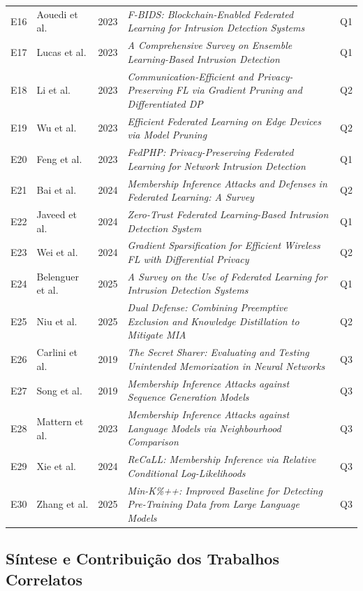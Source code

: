 \documentclass[
	12pt,				%
	openright,			%
	oneside,			%
	a4paper,			%
	english,			%
	french,				%
	spanish,			%
	brazil,				%
	]{abntex2}
\begin{document}
\begin{table}[H]
\begin{tabular}{p{0.4cm}p{3.0cm}p{0.6cm}p{7.5cm}p{1.2cm}}
E16 & Aouedi et al. & 2023 & \textit{F-BIDS: Blockchain-Enabled Federated Learning for Intrusion Detection Systems} & Q1 \\
E17 & Lucas et al. & 2023 & \textit{A Comprehensive Survey on Ensemble Learning-Based Intrusion Detection} & Q1 \\
E18 & Li et al. & 2023 & \textit{Communication-Efficient and Privacy-Preserving FL via Gradient Pruning and Differentiated DP} & Q2 \\
E19 & Wu et al. & 2023 & \textit{Efficient Federated Learning on Edge Devices via Model Pruning} & Q2 \\
E20 & Feng et al. & 2023 & \textit{FedPHP: Privacy-Preserving Federated Learning for Network Intrusion Detection} & Q1 \\
E21 & Bai et al. & 2024 & \textit{Membership Inference Attacks and Defenses in Federated Learning: A Survey} & Q2 \\
E22 & Javeed et al. & 2024 & \textit{Zero-Trust Federated Learning-Based Intrusion Detection System} & Q1 \\
E23 & Wei et al. & 2024 & \textit{Gradient Sparsification for Efficient Wireless FL with Differential Privacy} & Q2 \\
E24 & Belenguer et al. & 2025 & \textit{A Survey on the Use of Federated Learning for Intrusion Detection Systems} & Q1 \\
E25 & Niu et al. & 2025 & \textit{Dual Defense: Combining Preemptive Exclusion and Knowledge Distillation to Mitigate MIA} & Q2 \\
E26 & Carlini et al. & 2019 & \textit{The Secret Sharer: Evaluating and Testing Unintended Memorization in Neural Networks} & Q3 \\
E27 & Song et al. & 2019 & \textit{Membership Inference Attacks against Sequence Generation Models} & Q3 \\
E28 & Mattern et al. & 2023 & \textit{Membership Inference Attacks against Language Models via Neighbourhood Comparison} & Q3 \\
E29 & Xie et al. & 2024 & \textit{ReCaLL: Membership Inference via Relative Conditional Log-Likelihoods} & Q3 \\
E30 & Zhang et al. & 2025 & \textit{Min-K\%++: Improved Baseline for Detecting Pre-Training Data from Large Language Models} & Q3 \\
\bottomrule
\end{tabular}
\end{table}

\subsection{Síntese e Contribuição dos Trabalhos Correlatos}
\end{document}

